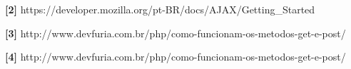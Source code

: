 \documentclass[12pt,a4paper]{article}
\begin{document}
\noindent \textbf{[2]} {https://developer.mozilla.org/pt-BR/docs/AJAX/Getting\_Started}\\\vspace{0.2cm}

\noindent \textbf{[3]} {http://www.devfuria.com.br/php/como-funcionam-os-metodos-get-e-post/}\\\vspace{0.2cm}




\noindent \textbf{[4]} {http://www.devfuria.com.br/php/como-funcionam-os-metodos-get-e-post/}\\\vspace{0.2cm}
\end{document}
